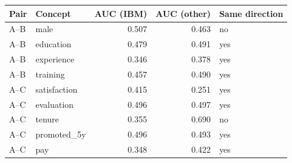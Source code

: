 \begin{tabular}{llrrl}
\hline
Pair & Concept & AUC (IBM) & AUC (other) & Same direction \\
\hline
A--B & male & 0.507 & 0.463 & no \\
A--B & education & 0.479 & 0.491 & yes \\
A--B & experience & 0.346 & 0.378 & yes \\
A--B & training & 0.457 & 0.490 & yes \\
A--C & satisfaction & 0.415 & 0.251 & yes \\
A--C & evaluation & 0.496 & 0.497 & yes \\
A--C & tenure & 0.355 & 0.690 & no \\
A--C & promoted\_5y & 0.496 & 0.493 & yes \\
A--C & pay & 0.348 & 0.422 & yes \\
\hline
\end{tabular}
